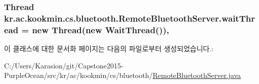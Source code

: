 \subsubsection[{wait\+Thread}]{\setlength{\rightskip}{0pt plus 5cm}Thread kr.\+ac.\+kookmin.\+cs.\+bluetooth.\+Remote\+Bluetooth\+Server.\+wait\+Thread = new Thread(new {\bf Wait\+Thread}())\hspace{0.3cm}{\ttfamily [static]}, {\ttfamily [private]}}\label{classkr_1_1ac_1_1kookmin_1_1cs_1_1bluetooth_1_1_remote_bluetooth_server_aa120ca6efe81b445c95027409a12e4fd}


이 클래스에 대한 문서화 페이지는 다음의 파일로부터 생성되었습니다.\+:\begin{DoxyCompactItemize}
\item 
C\+:/\+Users/\+Karasion/git/\+Capstone2015-\/\+Purple\+Ocean/src/kr/ac/kookmin/cs/bluetooth/\hyperlink{_remote_bluetooth_server_8java}{Remote\+Bluetooth\+Server.\+java}\end{DoxyCompactItemize}
